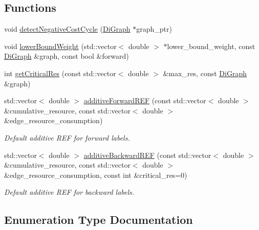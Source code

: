 \subsection*{Functions}
\begin{DoxyCompactItemize}
\item 
void \hyperlink{namespacebidirectional_a13e4a7c0617b0c9092e57cba21c75438}{detect\+Negative\+Cost\+Cycle} (\hyperlink{classbidirectional_1_1DiGraph}{Di\+Graph} $\ast$graph\+\_\+ptr)
\item 
void \hyperlink{namespacebidirectional_a35feb503e8ae674a3756aebc9a3b1d0f}{lower\+Bound\+Weight} (std\+::vector$<$ double $>$ $\ast$lower\+\_\+bound\+\_\+weight, const \hyperlink{classbidirectional_1_1DiGraph}{Di\+Graph} \&graph, const bool \&forward)
\item 
int \hyperlink{namespacebidirectional_a7b92b2282139801a9e2668a743ad07a1}{get\+Critical\+Res} (const std\+::vector$<$ double $>$ \&max\+\_\+res, const \hyperlink{classbidirectional_1_1DiGraph}{Di\+Graph} \&graph)
\item 
std\+::vector$<$ double $>$ \hyperlink{namespacebidirectional_a6b3d052fd58c8158b4e7a79acbed3c0e}{additive\+Forward\+R\+EF} (const std\+::vector$<$ double $>$ \&cumulative\+\_\+resource, const std\+::vector$<$ double $>$ \&edge\+\_\+resource\+\_\+consumption)
\begin{DoxyCompactList}\small\item\em Default additive R\+EF for forward labels. \end{DoxyCompactList}\item 
std\+::vector$<$ double $>$ \hyperlink{namespacebidirectional_a36f100766b94f6950283274ff7d4e7a6}{additive\+Backward\+R\+EF} (const std\+::vector$<$ double $>$ \&cumulative\+\_\+resource, const std\+::vector$<$ double $>$ \&edge\+\_\+resource\+\_\+consumption, const int \&critical\+\_\+res=0)
\begin{DoxyCompactList}\small\item\em Default additive R\+EF for backward labels. \end{DoxyCompactList}\end{DoxyCompactItemize}


\subsection{Enumeration Type Documentation}
\mbox{\label{namespacebidirectional_a4cbe6f0bfbd3629c2cd44c98014aed70}} 
